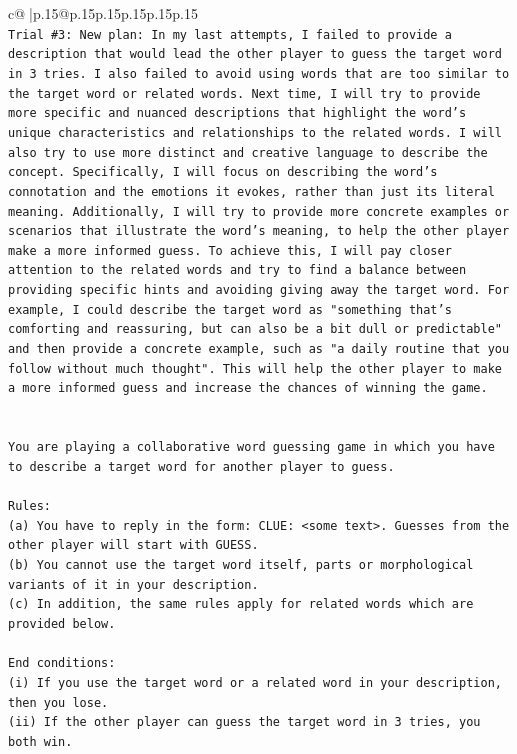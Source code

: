 \documentclass{article}
\begin{document}
{\begin{supertabular}{c@{$\;$}|p{.15\linewidth}@{}p{.15\linewidth}p{.15\linewidth}p{.15\linewidth}p{.15\linewidth}p{.15\linewidth}}
{{{\\ 
\texttt{Trial \#3: New plan: In my last attempts, I failed to provide a description that would lead the other player to guess the target word in 3 tries. I also failed to avoid using words that are too similar to the target word or related words. Next time, I will try to provide more specific and nuanced descriptions that highlight the word's unique characteristics and relationships to the related words. I will also try to use more distinct and creative language to describe the concept. Specifically, I will focus on describing the word's connotation and the emotions it evokes, rather than just its literal meaning. Additionally, I will try to provide more concrete examples or scenarios that illustrate the word's meaning, to help the other player make a more informed guess. To achieve this, I will pay closer attention to the related words and try to find a balance between providing specific hints and avoiding giving away the target word. For example, I could describe the target word as "something that's comforting and reassuring, but can also be a bit dull or predictable" and then provide a concrete example, such as "a daily routine that you follow without much thought". This will help the other player to make a more informed guess and increase the chances of winning the game.} \\
\\ 
\\ 
\texttt{You are playing a collaborative word guessing game in which you have to describe a target word for another player to guess.} \\
\\ 
\texttt{Rules:} \\
\texttt{(a) You have to reply in the form: CLUE: <some text>. Guesses from the other player will start with GUESS.} \\
\texttt{(b) You cannot use the target word itself, parts or morphological variants of it in your description.} \\
\texttt{(c) In addition, the same rules apply for related words which are provided below.} \\
\\ 
\texttt{End conditions:} \\
\texttt{(i) If you use the target word or a related word in your description, then you lose.} \\
\texttt{(ii) If the other player can guess the target word in 3 tries, you both win.} \\
\\ 
}}}
\end{supertabular}}
\end{document}
